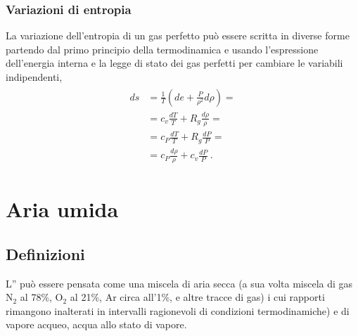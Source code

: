 \documentclass[letterpaper,10pt,italian]{jupyterBook}
\begin{document}
\subsubsection{Variazioni di entropia}
\label{\detokenize{ch/thermodynamics/ideal-gas-formulas:variazioni-di-entropia}}
\sphinxAtStartPar
La variazione dell’entropia di un gas perfetto può essere scritta in diverse forme partendo dal primo principio della termodinamica e usando l’espressione dell’energia interna e la legge di stato dei gas perfetti per cambiare le variabili indipendenti,
\begin{equation*}
\begin{split}\begin{aligned}
  ds & = \frac{1}{T} \left( d e + \frac{P}{\rho^2} d \rho \right) = \\
     & = c_v \frac{dT}{T} + R_g \frac{d \rho}{\rho} = \\
     & = c_P \frac{dT}{T} + R_g \frac{d P}{P} = \\
     & = c_P \frac{d \rho}{\rho} + c_v \frac{d P}{P}  \ .
\end{aligned}\end{split}
\end{equation*}
\sphinxstepscope


\section{Aria umida}
\label{\detokenize{ch/thermodynamics/humid-air:aria-umida}}\label{\detokenize{ch/thermodynamics/humid-air:physics-hs-thermodynamics-matter-humid-air}}\label{\detokenize{ch/thermodynamics/humid-air::doc}}

\subsection{Definizioni}
\label{\detokenize{ch/thermodynamics/humid-air:definizioni}}
\sphinxAtStartPar
L” può essere pensata come una miscela di aria secca (a sua volta miscela di gas N\(_2\) al 78\%, O\(_2\) al 21\%, Ar circa all’1\%, e altre tracce di gas) i cui rapporti rimangono inalterati in intervalli ragionevoli di condizioni termodinamiche) e di vapore acqueo, acqua allo stato di vapore.
\end{document}
